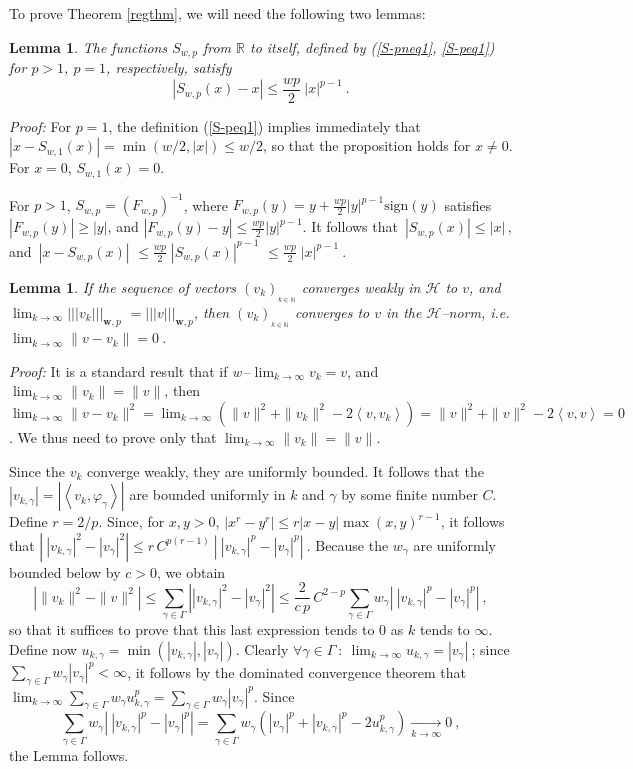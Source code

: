 \documentclass[10pt]{article}
\newtheorem{lemma}[theorem]{Lemma}
\newcommand{\QED}{\hfill \raisebox{-2pt}{\rule{5.6pt}{8pt}\rule{4pt}{0pt}}%
  \smallskip\par}
\def\R{\mathbb{R}}
\def\N{\mathbb{N}}
\def\cH{\mathcal{H}}
\def\ag{w_{\gamma}}
\def\vpg{\varphi_{\gamma}}
\def\g{\gamma}
\newcommand\eref[1]{(\ref{#1})}
\def\Vvert{\vert\!\vert\!\vert}
\begin{document}
To prove Theorem \ref{regthm}, we will need the following two lemmas:

\begin{lemma}
\label{lm-4-1}
The functions $S_{w,p}$ from $\R$ to itself, defined by {\rm (\ref{S-pneq1},
\ref{S-peq1})} for $p>1$, $p=1$, respectively, satisfy
$$
|S_{w,p}(x)-x| \leq {\frac{wp}{2}}\ |x|^{p-1}~.
$$
\end{lemma}
{\em Proof:}
For $p=1$, the definition \eref{S-peq1} implies immediately that
$|x-S_{w,1}(x)|= \min(w/2,|x|) \leq w/2$, so that the proposition holds
for $x \neq 0$. For $x=0$, $S_{w,1}(x)=0$.

For $p>1$, $S_{w,p}= \left( F_{w,p} \right)^{-1}$, where
$F_{w,p}(y)=y+{\frac{wp}{2}}|y|^{p-1} \mbox{sign}(y)$ satisfies $|F_{w,p}(y)|
\geq |y|$, and $|F_{w,p}(y)-y| \leq {\frac{wp}{2}} |y|^{p-1}$.
It follows that $\, |S_{w,p}(x)| \leq |x|\,$, and
$\, |x-S_{w,p}(x)| $ $\leq {\frac{wp}{2}} \; |S_{w,p}(x)|^{p-1} $
$ \leq {\frac{wp}{2}}\; |x|^{p-1} ~$.
$~~~~~~~~~~~~~~~~~~$ \hfill \QED

\bigskip

\begin{lemma}
\label{lm-conv}
If the sequence of vectors $\left(v_k\right)_{ _{k \in \N}}$ converges weakly
in $\cH$ to $v$, and $\lim_{k \to \infty} \Vvert v_k \Vvert_{\mathbf{w},p}$
$ = \Vvert v \Vvert_{\mathbf{w},p}$,
then $\left(v_k\right)_{ _{k \in \N}}$ converges
to $v$ in the $\cH$--norm, i.e. $\lim_{k \to \infty} \|v-v_k\|=0~$.
\end{lemma}
{\em Proof:}
It is a standard result that if {\em w}$\,$--$\lim_{k \to \infty} v_k = v$,
and
$\lim_{k \to \infty} \|v_k\|=\|v\|$, then $\lim_{k \to \infty} \|v- v_k\|^2
= \lim_{k \to \infty} \left( \|v\|^2 + \|v_k\|^2 - 2 \left< v, v_k \right>
\right)
=  \|v\|^2 + \|v\|^2 - 2 \left< v, v \right>
 = 0$.
We thus need to prove only that $\lim_{k \to \infty} \|v_k\|=\|v\|$.

Since the $v_k$ converge weakly, they are uniformly bounded. It follows that
the $|v_{k,\g}| = |\left<v_k, \vpg \right>|$ are bounded uniformly in $k$
and $\g$
by some finite number $C$. Define $r=2/p$. Since, for $x, y > 0$,
$|x^r - y^r| \leq r |x-y| \max(x,y)^{r-1}$, it follows that
$ \left|~|v_{k,\g}|^2 -|v_{\g}|^2 \right|
\leq r \, C^{p(r-1)}~  \left| ~ |v_{k,\g}|^p -|v_{\g}|^p \right|~.$
Because the $\ag$ are uniformly bounded below by $c>0$, we obtain
$$
\left| \|v_k\|^2 -\|v\|^2 \right| \leq
\sum_{\g \in \Gamma} \left| |v_{k,\g}|^2 - |v_{\g}|^2 \right|
\leq \frac{2}{c \, p}\, C^{2-p} \sum_{\g \in \Gamma}
\ag \left| ~ |v_{k,\g}|^p -|v_{\g}|^p \right| ~,
$$
so that it suffices to prove that this last expression tends to $0$
as $k$ tends to $\infty$.
Define now $u_{k,\g}=\min \left( |v_{k,\g}|,|v_{\g}| \right)$. Clearly
$ \forall \g \in \Gamma ~:~ \lim_{k \to \infty} u_{k,\g}= |v_{\g}|~$; since
$\sum_{\g \in \Gamma}  \ag |v_{\g}|^p < \infty$, it follows by the dominated
convergence theorem that $\lim_{k \to \infty}
\sum_{\g \in \Gamma}  \ag u_{k,\g}^p =
\sum_{\g \in \Gamma}  \ag |v_{\g}|^p $. Since
$$
\sum_{\g \in \Gamma}
\ag \left| ~ |v_{k,\g}|^p -|v_{\g}|^p \right| =
\sum_{\g \in \Gamma}  \ag \left( |v_{\g}|^p + |v_{k,\g}|^p
- 2 u_{k,\g}^p \right) \xrightarrow[k \to \infty]{~} 0 ~,
$$
the Lemma follows. \hfill \QED
\end{document}
